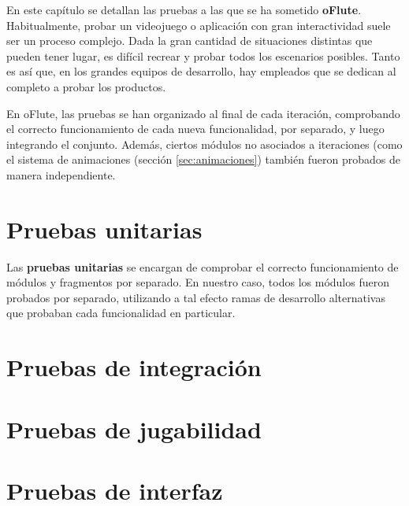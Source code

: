 En este capítulo se detallan las pruebas a las que se ha sometido
\textbf{oFlute}. Habitualmente, probar un videojuego o aplicación con gran
interactividad suele ser un proceso complejo. Dada la gran cantidad de
situaciones distintas que pueden tener lugar, es difícil recrear y probar todos
los escenarios posibles. Tanto es así que, en los grandes equipos de desarrollo,
hay empleados que se dedican al completo a probar los productos.

En oFlute, las pruebas se han organizado al final de cada iteración, comprobando
el correcto funcionamiento de cada nueva funcionalidad, por separado, y luego
integrando el conjunto. Además, ciertos módulos no asociados a iteraciones (como
el sistema de animaciones (sección \ref{sec:animaciones}) también fueron
probados de manera independiente.

\section{Pruebas unitarias}
Las \textbf{pruebas unitarias} se encargan de comprobar el correcto
funcionamiento de módulos y fragmentos por separado. En nuestro caso, todos los
módulos fueron probados por separado, utilizando a tal efecto ramas de
desarrollo alternativas que probaban cada funcionalidad en particular. 

\section{Pruebas de integración}

\section{Pruebas de jugabilidad}

\section{Pruebas de interfaz}

